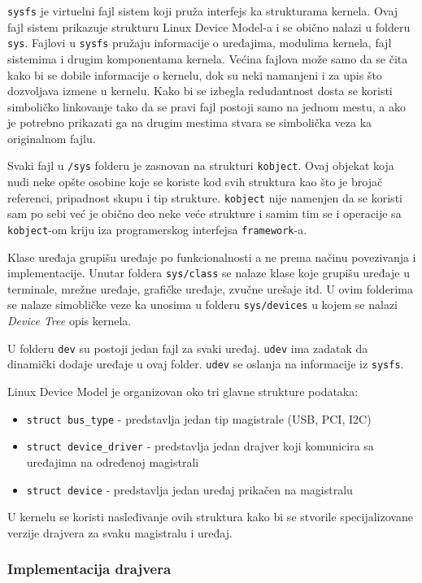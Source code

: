 \texttt{sysfs} je virtuelni fajl sistem koji pruža interfejs ka strukturama kernela. Ovaj fajl sistem prikazuje strukturu Linux Device Model-a  i se obično nalazi u folderu \texttt{sys}.  Fajlovi u \texttt{sysfs}  pružaju informacije o uređajima, modulima kernela, fajl sistemima i drugim komponentama kernela. Većina fajlova može samo da se čita kako bi se dobile informacije o kernelu, dok su neki namanjeni i za upis što dozvoljava izmene u kernelu. Kako bi se izbegla redudantnost dosta se koristi simboličko linkovanje tako da se pravi fajl postoji samo na jednom mestu, a ako je potrebno prikazati ga na drugim mestima stvara se simbolička veza ka originalnom fajlu.

Svaki fajl u \texttt{/sys} folderu je zasnovan na strukturi \texttt{kobject}. Ovaj objekat koja nudi neke opšte osobine koje se koriste kod svih struktura kao što je brojač referenci, pripadnost skupu i tip strukture. \texttt{kobject} nije namenjen da se koristi sam po sebi već je obično deo neke veće strukture i samim tim se i operacije sa \texttt{kobject}-om kriju iza programerskog interfejsa \texttt{framework}-a. 

Klase uređaja grupišu uređaje po funkcionalnosti a ne prema načinu povezivanja i implementacije. Unutar foldera \texttt{sys/class} se nalaze klase koje grupišu uređaje u terminale, mrežne uređaje, grafičke uređaje, zvučne urešaje itd. U ovim folderima se nalaze simobličke veze ka unosima u folderu \texttt{sys/devices} u kojem se nalazi \textit{Device Tree} opis kernela. 

U folderu \texttt{dev} su postoji jedan fajl za svaki uređaj. \texttt{udev} ima zadatak da dinamički dodaje uređaje u ovaj folder. \texttt{udev} se oslanja na informacije iz \texttt{sysfs}.

Linux Device Model je organizovan oko tri glavne strukture podataka:
\begin{itemize}
\item \texttt{struct bus\_type} - predstavlja jedan tip magistrale (USB, PCI, I2C)
\item \texttt{struct device\_driver} - predstavlja jedan drajver koji komunicira sa uređajima na određenoj magistrali
\item \texttt{struct device} - predstavlja jedan uređaj prikačen na magistralu
\end{itemize}
U kernelu se koristi nasleđivanje ovih struktura kako bi se stvorile specijalizovane verzije drajvera za svaku magistralu i uređaj.

\subsubsection{Implementacija drajvera}

